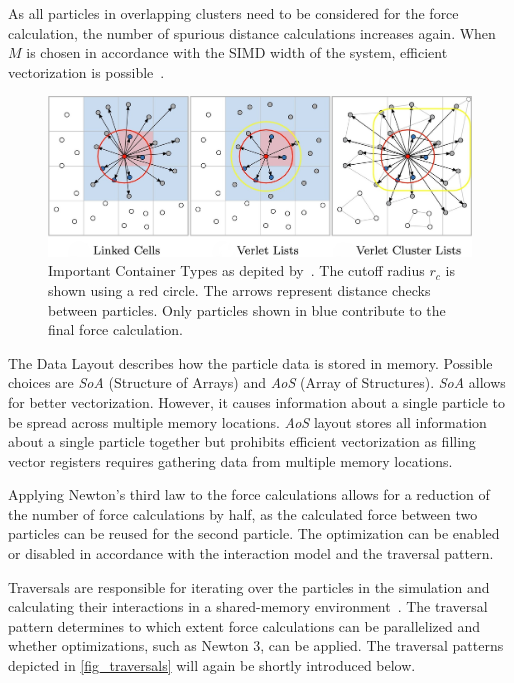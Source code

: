 \documentclass[conference]{IEEEtran}
\begin{document}
\begin{description}[style=nextline]
\begin{description}[style=nextline, font=\itshape]
                As all particles in overlapping clusters need to be considered for the force calculation, the number of spurious distance calculations increases again. When $M$ is chosen in accordance with the SIMD width of the system, efficient vectorization is possible~\cite{Gratl2022AutoPas}.
        \end{description}

        \begin{figure}[h]
            \centering
            \includegraphics[width=\columnwidth]{figures/containers.jpg}
            \caption{Important Container Types as depited by~\cite{Gratl2022AutoPas}. The cutoff radius $r_c$ is shown using a red circle. The arrows represent distance checks between particles. Only particles shown in blue contribute to the final force calculation.}
            \label{fig_containers}
        \end{figure}

    \item[Data Layout]
        The Data Layout describes how the particle data is stored in memory. Possible choices are \textit{SoA} (Structure of Arrays) and \textit{AoS} (Array of Structures). \textit{SoA} allows for better vectorization. However, it causes information about a single particle to be spread across multiple memory locations. \textit{AoS} layout stores all information about a single particle together but prohibits efficient vectorization as filling vector registers requires gathering data from multiple memory locations.

    \item[Newton 3]
        Applying Newton's third law to the force calculations allows for a reduction of the number of force calculations by half, as the calculated force between two particles can be reused for the second particle. The optimization can be enabled or disabled in accordance with the interaction model and the traversal pattern.

    \item[Traversal]
        Traversals are responsible for iterating over the particles in the simulation and calculating their interactions in a shared-memory environment~\cite{SECKLER2021101296}. The traversal pattern determines to which extent force calculations can be parallelized and whether optimizations, such as Newton 3, can be applied. The traversal patterns depicted in \autoref{fig_traversals} will again be shortly introduced below.


\end{description}
\end{document}
